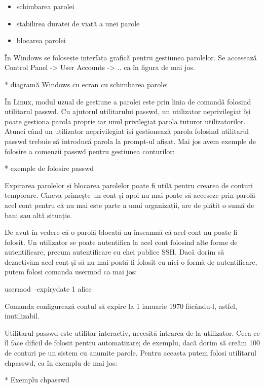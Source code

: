 \begin{itemize}
	\item schimbarea parolei
	\item stabilirea duratei de viață a unei parole
	\item blocarea parolei
\end{itemize}

În Windows se folosește interfața grafică pentru gestiunea parolelor. Se
accesează Control Panel -> User Accounts -> .. ca în figura de mai jos.

* diagramă Windows cu ecran cu schimbarea parolei

În Linux, modul uzual de gestiune a parolei este prin linia de comandă folosind
utilitarul passwd. Cu ajutorul utilitarului passwd, un utilizator neprivilegiat
își poate gestiona parola proprie iar unul privilegiat parola tuturor
utilizatorilor. Atunci când un utilizator neprivilegiat își gestionează parola
folosind utilitarul passwd trebuie să introducă parola la prompt-ul afișat. Mai
jos avem exemple de folosire a comenzii passwd pentru gestiunea conturilor:

* exemple de folosire passwd

Expirarea parolelor și blocarea parolelor poate fi utilă pentru crearea de
conturi temporare. Cineva primește un cont și apoi nu mai poate să acceseze prin
parolă acel cont pentru că nu mai este parte a unui organizații, are de plătit o
sumă de bani sau altă situație.

De avut în vedere că o parolă blocată nu înseamnă că acel cont nu poate fi
folosit. Un utilizator se poate autentifica la acel cont folosind alte forme de
autentificare, precum autentificare cu chei publice SSH. Dacă dorim să
dezactivăm acel cont și să nu mai poată fi folosit cu nici o formă de
autentificare, putem folosi comanda usermod ca mai jos:

\begin{screen}
usermod --expirydate 1 alice
\end{screen}

Comanda configurează contul să expire la 1 ianuarie 1970 făcându-l, astfel,
inutilizabil.

Utilitarul passwd este utilitar interactiv, necesită intrarea de la utilizator.
Ceea ce îl face dificil de folosit pentru automatizare; de exemplu, dacă dorim
să creăm 100 de conturi pe un sistem cu anumite parole. Pentru aceasta putem
folosi utilitarul chpasswd, ca în exemplu de mai jos:

* Exemplu chpasswd

